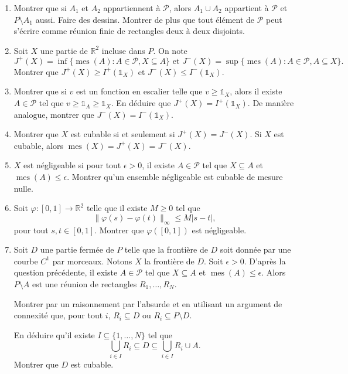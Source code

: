 \documentclass[11pt,a4paper]{article}
\newcommand{\RR}{\mathbb{R}}
\let\geq\geqslant
\let\leq\leqslant
\begin{document}
		\begin{enumerate} 
			\item Montrer que si $A_1$ et $A_2$ appartiennent à $\mathcal{P}$, alors $A_1\cup A_2$ appartient à $\mathcal{P}$ et $P\setminus A_1$ aussi. 
			Faire des dessins.
			Montrer de plus que tout élément de $\mathcal{P}$ peut s'écrire comme réunion finie de rectangles deux à deux disjoints.
			
			\item Soit $X$ une partie de $\RR^2$ incluse dans $P$. 
			On note
			\[     J^+(X)=\inf\big\{\operatorname{mes}(A) : A \in \mathcal{P}, X \subseteq A \big\} 
			\text{ et } J^-(X)=\sup \big\{\operatorname{mes}(A) : A \in \mathcal{P}, A\subseteq X\big\}.     \]
			Montrer que $J^+(X)\geq I^+(\mathbb{1}_X)$ et $ J^-(X)\leq I^-(\mathbb{1}_X)$.
			
			\item Montrer que si $v$ est un fonction en escalier telle que $v \geq \mathbb{1}_X$, alors il existe $A\in \mathcal{P}$ tel que $v\geq \mathbb{1}_A \geq \mathbb{1}_X$.
			En déduire que $J^+(X)=I^+(\mathbb{1}_X)$. 
			De manière analogue, montrer que $J^-(X)= I^-(\mathbb{1}_X)$.
			
			\item Montrer que $X$ est cubable si et seulement si $J^+(X)=J^-(X)$. 
			Si $X$ est cubable, alors $\operatorname{mes}(X)=J^+(X)=J^-(X)$.
			
			\item $X$ est négligeable si pour tout $\epsilon>0$, il existe $A \in \mathcal{P}$ tel que $X \subseteq A$ et $\operatorname{mes}(A) \leq \epsilon$.
			Montrer qu'un ensemble négligeable est cubable de mesure nulle.
			
			\item Soit $\varphi : [0,1]\rightarrow \RR^2$ telle que il existe $M \geq 0$ tel que 
			\[     \| \varphi(s)-\varphi(t) \|_\infty \leq M|s-t|,     \]
			pour tout $s,t\in [0,1]$. 
			Montrer que $\varphi([0,1])$ est négligeable.
			
			\item Soit $D$ une partie fermée de $P$ telle que la frontière de $D$ soit donnée par une courbe $C^1$ par morceaux. 
			Notons $X$ la frontière de $D$. Soit $\epsilon>0$. 
			D'après la question précédente, il existe $A \in \mathcal{P}$ tel que $X \subseteq A$ et $\operatorname{mes}(A) \leq \epsilon$. Alors $P \setminus A$ est une réunion de rectangles $R_1,\dots,R_N$. 
			
			Montrer par un raisonnement par l'absurde et en utilisant un argument de connexité que, pour tout $i$, $R_i\subseteq D$ ou $R_i\subseteq P\setminus D$.
			
			En déduire qu'il existe $I \subseteq \{1,\ldots,N\}$ tel que 
			\[     \bigcup_{i\in I}R_i\subseteq D\subseteq  \bigcup_{i\in I}R_i\cup A.     \]
			Montrer que $D$ est cubable.
		\end{enumerate}
		
\end{document}
